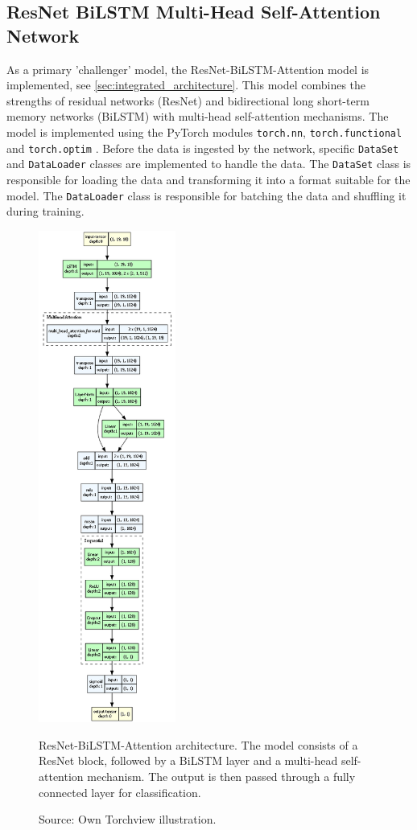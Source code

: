 \subsection{ResNet BiLSTM Multi-Head Self-Attention Network}
As a primary 'challenger' model, the ResNet-BiLSTM-Attention model is implemented, see \autoref{sec:integrated_architecture}. This model combines the strengths of residual networks (ResNet) and bidirectional long short-term memory networks (BiLSTM) with multi-head self-attention mechanisms. The model is implemented using the PyTorch modules \texttt{torch.nn}, \texttt{torch.functional} and \texttt{torch.optim} \autocite{PyTorch}. Before the data is ingested by the network, specific \texttt{DataSet} and \texttt{DataLoader} classes are implemented to handle the data. The \texttt{DataSet} class is responsible for loading the data and transforming it into a format suitable for the model. The \texttt{DataLoader} class is responsible for batching the data and shuffling it during training.

\begin{figure}[htbp]
    \centering
    \includegraphics[width=0.4\textwidth]{figures/architecture.png}
    \caption{ResNet-BiLSTM-Attention architecture. The model consists of a ResNet block, followed by a BiLSTM layer and a multi-head self-attention mechanism. The output is then passed through a fully connected layer for classification.}
    \label{fig:architecture}
    \caption*{Source: Own Torchview illustration.}
\end{figure}

